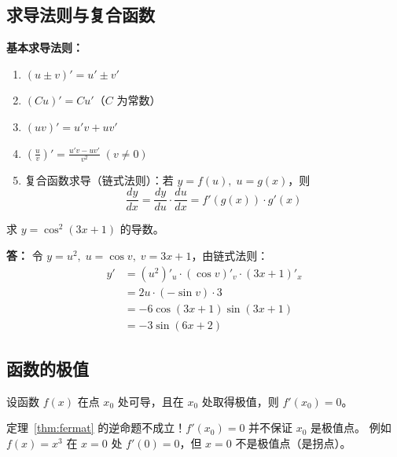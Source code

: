 \documentclass{harryopo-mathnotes}
\begin{document}
\subsection{求导法则与复合函数}


\textbf{基本求导法则：}
\begin{enumerate}
  \item $(u\pm v)'=u'\pm v'$
  \item $(Cu)'=Cu'$（$C$ 为常数）
  \item $(uv)'=u'v+uv'$
  \item $\displaystyle\left(\frac{u}{v}\right)'=\frac{u'v-uv'}{v^2}\;(v\neq 0)$
  \item 复合函数求导（链式法则）：若 $y=f(u),\;u=g(x)$，则
    $$\frac{dy}{dx}=\frac{dy}{du}\cdot\frac{du}{dx}=f'(g(x))\cdot g'(x)$$
\end{enumerate}

\begin{exercise}[链式法则练习]
  求 $y=\cos^2(3x+1)$ 的导数。
\end{exercise}
\begin{answer}
  \textbf{答：}
  {\fzkt 令 $y=u^2,\;u=\cos v,\;v=3x+1$，由链式法则：
  \begin{align*}
    y' &= (u^2)'_u\cdot(\cos v)'_v\cdot(3x+1)'_x \\
       &= 2u\cdot(-\sin v)\cdot 3 \\
       &= -6\cos(3x+1)\sin(3x+1) \\
       &= -3\sin(6x+2)
  \end{align*}}
\end{answer}

\subsection{函数的极值}

\begin{formal}
\begin{theorem}[费马定理]\label{thm:fermat}
设函数 $f(x)$ 在点 $x_0$ 处可导，且在 $x_0$ 处取得极值，则 $f'(x_0)=0$。
\end{theorem}
\end{formal}

\begin{attention}
  定理~\ref{thm:fermat} 的逆命题不成立！$f'(x_0)=0$ 并不保证 $x_0$ 是极值点。
  例如 $f(x)=x^3$ 在 $x=0$ 处 $f'(0)=0$，但 $x=0$ 不是极值点（是拐点）。
\end{attention}
\end{document}
